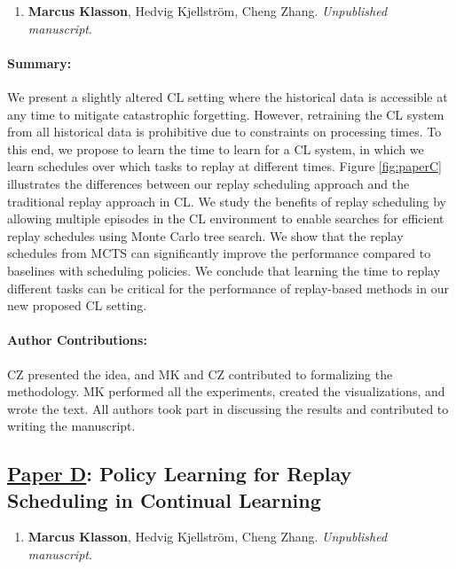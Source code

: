\begin{enumerate}
	\item[] \textbf{Marcus Klasson}, Hedvig Kjellström, Cheng Zhang. \textit{Unpublished manuscript}. %
\end{enumerate}

\vspace{-3mm}
\paragraph{Summary:} We present a slightly altered CL setting where the historical data is accessible at any time to mitigate catastrophic forgetting. However, retraining the CL system from all historical data is prohibitive due to constraints on processing times. To this end, we propose to learn the time to learn for a CL system, in which we learn schedules over which tasks to replay at different times. Figure \ref{fig:paperC} illustrates the differences between our replay scheduling approach and the traditional replay approach in CL. We study the benefits of replay scheduling by allowing multiple episodes in the CL environment to enable searches for efficient replay schedules using Monte Carlo tree search. We show that the replay schedules from MCTS can significantly improve the performance compared to baselines with scheduling policies. We conclude that learning the time to replay different tasks can be critical for the performance of replay-based methods in our new proposed CL setting. 

\vspace{-3mm}
\paragraph{Author Contributions:} CZ presented the idea, and MK and CZ contributed to formalizing the methodology. MK performed all the experiments, created the visualizations, and wrote the text. All authors took part in discussing the results and contributed to writing the manuscript. 


\subsection{\underline{Paper D}: %
	Policy Learning for Replay Scheduling in Continual Learning}


\begin{enumerate}
	\item[] \textbf{Marcus Klasson}, Hedvig Kjellström, Cheng Zhang. \textit{Unpublished manuscript}.%
\end{enumerate}


